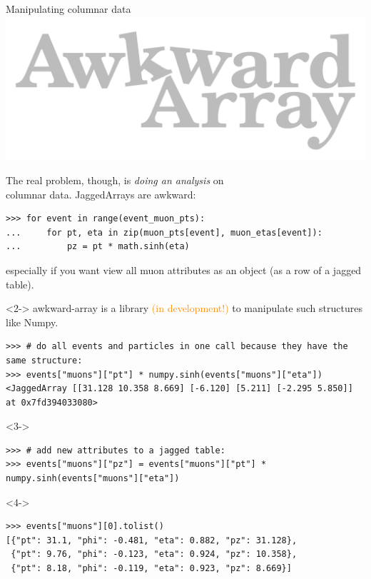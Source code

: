 \documentclass[aspectratio=169]{beamer}
\begin{document}
\begin{frame}[fragile]{Manipulating columnar data}
\vspace{0.5 cm}
\hfill \includegraphics[height=2 cm]{awkward-logo.pdf}

\vspace{-2 cm}
The real problem, though, is {\it doing an analysis} on \\
columnar data. JaggedArrays are awkward:

\scriptsize
\begin{verbatim}
>>> for event in range(event_muon_pts):
...     for pt, eta in zip(muon_pts[event], muon_etas[event]):
...         pz = pt * math.sinh(eta)
\end{verbatim}

\normalsize
especially if you want view all muon attributes as an object (as a row of a jagged table).

\vspace{0.25 cm}
\begin{uncoverenv}<2->
awkward-array is a library \textcolor{darkorange}{(in development!)} to manipulate such structures like Numpy.

\scriptsize
\begin{verbatim}
>>> # do all events and particles in one call because they have the same structure:
>>> events["muons"]["pt"] * numpy.sinh(events["muons"]["eta"])
<JaggedArray [[31.128 10.358 8.669] [-6.120] [5.211] [-2.295 5.850]] at 0x7fd394033080>
\end{verbatim}
\end{uncoverenv}

\begin{uncoverenv}<3->
\scriptsize
\begin{verbatim}
>>> # add new attributes to a jagged table:
>>> events["muons"]["pz"] = events["muons"]["pt"] * numpy.sinh(events["muons"]["eta"])
\end{verbatim}
\end{uncoverenv}

\begin{uncoverenv}<4->
\scriptsize
\begin{verbatim}
>>> events["muons"][0].tolist()
[{"pt": 31.1, "phi": -0.481, "eta": 0.882, "pz": 31.128},
 {"pt": 9.76, "phi": -0.123, "eta": 0.924, "pz": 10.358},
 {"pt": 8.18, "phi": -0.119, "eta": 0.923, "pz": 8.669}]
\end{verbatim}
\end{uncoverenv}
\end{frame}
\end{document}
